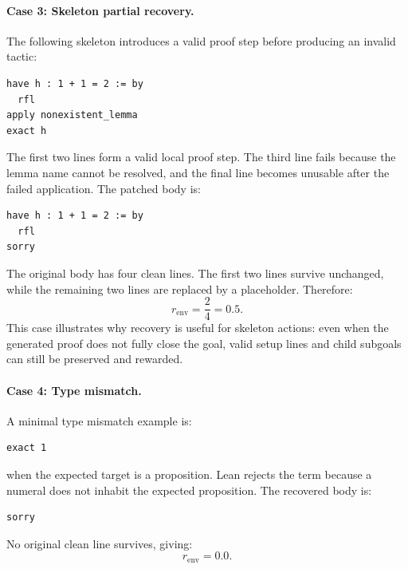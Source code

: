\documentclass[en]{uet_awesome_thesis/uet-awesome-thesis}
\begin{document}
\begin{appendices}
\paragraph{Case 3: Skeleton partial recovery.}
The following skeleton introduces a valid proof step before producing an invalid tactic:
\begin{verbatim}
have h : 1 + 1 = 2 := by
  rfl
apply nonexistent_lemma
exact h
\end{verbatim}
The first two lines form a valid local proof step. The third line fails because the
lemma name cannot be resolved, and the final line becomes unusable after the failed application. The
patched body is:
\begin{verbatim}
have h : 1 + 1 = 2 := by
  rfl
sorry
\end{verbatim}
The original body has four clean lines. The first two lines survive unchanged, while the remaining two
lines are replaced by a placeholder. Therefore:
\[
r_{\text{env}} = \frac{2}{4} = 0.5.
\]
This case illustrates why recovery is useful for skeleton actions: even when the generated proof does not
fully close the goal, valid setup lines and child subgoals can still be preserved and rewarded.

\paragraph{Case 4: Type mismatch.}
A minimal type mismatch example is:
\begin{verbatim}
exact 1
\end{verbatim}
when the expected target is a proposition. Lean rejects the term because a numeral does not inhabit the
expected proposition. The recovered body is:
\begin{verbatim}
sorry
\end{verbatim}
No original clean line survives, giving:
\[
r_{\text{env}} = 0.0.
\]

\end{appendices}
\end{document}
